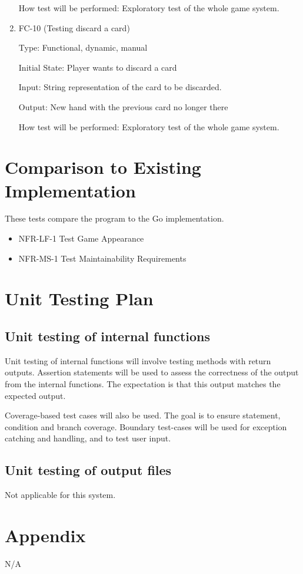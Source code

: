 \documentclass[12pt, titlepage]{article}
\begin{document}
\begin{enumerate}
How test will be performed: Exploratory test of the whole game system.

\item{FC-10 (Testing discard a card) \\}

Type: Functional, dynamic, manual
					
Initial State: Player wants to discard a card
					
Input: String representation of the card to be discarded.
					
Output: New hand with the previous card no longer there
					
How test will be performed: Exploratory test of the whole game system.
\end{enumerate}

	
\section{Comparison to Existing Implementation}
These tests compare the program to the Go implementation.
\begin{itemize}
    \item NFR-LF-1 Test Game Appearance
    \item NFR-MS-1 Test Maintainability Requirements
\end{itemize}

\section{Unit Testing Plan}
		
\subsection{Unit testing of internal functions}
Unit testing of internal functions will involve testing methods with return outputs. Assertion statements will be used to assess the correctness of the output from the internal functions. The expectation is that this output matches the expected output. 

Coverage-based test cases will also be used. The goal is to ensure statement, condition and branch coverage. Boundary test-cases will be used for exception catching and handling, and to test user input.

\subsection{Unit testing of output files}		
Not applicable for this system.





\newpage

\section{Appendix}

N/A
\end{document}
